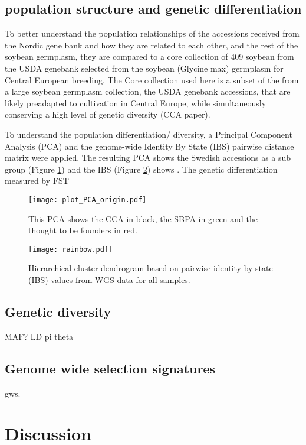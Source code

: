 \documentclass[9pt,twocolumn,twoside,lineno]{gsajnl}
\begin{document}
\subsection{population structure and genetic differentiation} 

To better understand the population relationships of the accessions received from the Nordic gene bank and how they are related to each other, and the rest of the soybean germplasm, they are compared to a core collection of 409 soybean from the USDA genebank selected from the soybean (Glycine max) germplasm for Central European breeding.  The Core collection used here is a subset of the from a large soybean germplasm collection, the  USDA genebank accessions, that are likely preadapted to cultivation in Central Europe, while simultaneously conserving a high level of genetic diversity (CCA paper). 

To understand the population differentiation/ diversity, a Principal Component Analysis (PCA) and the genome-wide Identity By State (IBS) pairwise distance matrix were applied. The resulting PCA shows the Swedish accessions as a sub group (Figure \ref{fig:pca}) and the IBS (Figure  \ref{fig:dendo}) shows . 
The genetic differentiation measured by FST 

\begin{figure}[t]
\centering
\texttt{[image: plot\_PCA\_origin.pdf]}
\caption{This PCA shows the CCA in black, the SBPA in green and the thought to be founders in red.}%
\label{fig:pca}
\end{figure}

\begin{figure}[t]
\centering
\texttt{[image: rainbow.pdf]}
\caption{Hierarchical cluster dendrogram based on pairwise identity-by-state (IBS) values from WGS data for all samples. }%
\label{fig:dendo}
\end{figure}

\subsection{Genetic diversity} 

MAF?
LD
pi 
theta


\subsection{Genome wide selection signatures} 
gws.



\section{Discussion}
\end{document}
